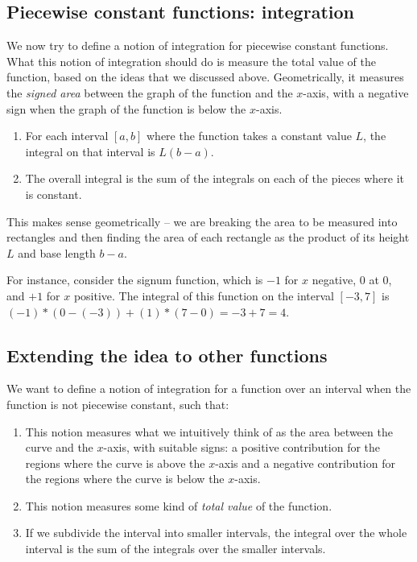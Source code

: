 \documentclass{amsart}
\begin{document}
\subsection{Piecewise constant functions: integration}

We now try to define a notion of integration for piecewise constant
functions. What this notion of integration should do is measure the
total value of the function, based on the ideas that we discussed
above. Geometrically, it measures the {\em signed area} between the
graph of the function and the $x$-axis, with a negative sign when the
graph of the function is below the $x$-axis.

\begin{enumerate}
\item For each interval $[a,b]$ where the function takes a constant
  value $L$, the integral on that interval is $L(b-a)$.
\item The overall integral is the sum of the integrals on each of the
  pieces where it is constant.
\end{enumerate}

This makes sense geometrically -- we are breaking the area to be
measured into rectangles and then finding the area of each rectangle
as the product of its height $L$ and base length $b - a$.

For instance, consider the signum function, which is $-1$ for $x$
negative, $0$ at $0$, and $+1$ for $x$ positive. The integral of this
function on the interval $[-3,7]$ is $(-1) * (0-(-3)) + (1) * (7 - 0)
= -3 + 7 = 4$.

\subsection{Extending the idea to other functions}

We want to define a notion of integration for a function over an
interval when the function is not piecewise constant, such that:

\begin{enumerate}
\item This notion measures what we intuitively think of as the area
  between the curve and the $x$-axis, with suitable signs: a positive
  contribution for the regions where the curve is above the $x$-axis
  and a negative contribution for the regions where the curve is below
  the $x$-axis.
\item This notion measures some kind of {\em total value} of the function.
\item If we subdivide the interval into smaller intervals, the
  integral over the whole interval is the sum of the integrals over
  the smaller intervals.
\end{enumerate}
\end{document}
